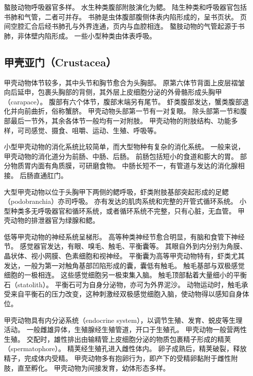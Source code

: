 \documentclass[11pt]{article}
\begin{document}
\newline

螯肢动物呼吸器官多样。
水生种类腹部附肢演化为鳃。
陆生种类和呼吸器官包括书肺和气管，二者可并存。
书肺是虫体腹部腹侧体表内陷形成的，呈书页状。
页间空腔汇合后经书肺孔与外界连通，页内与血腔相连。
螯肢动物的气管起源于书肺，非体壁内陷形成。
一些小型种类由体表呼吸。

\subsection{甲壳亚门（Crustacea）}
甲壳动物体节较多，其中头节和胸节愈合为头胸部。
原第六体节背面上皮层褶皱向后延申，包裹头胸部的背侧，其外层上皮细胞分泌的外骨骼形成头胸甲（carapace）。
腹部有六个体节，腹部末端另有尾节。
虾类腹部发达，蟹类腹部退化并向前曲折，俗称蟹脐。
甲壳动物头部第一节有一对复眼。
除头部第一节和腹部最后一节外，其余各体节一般均有一对附肢。
甲壳动物的附肢结构、功能多样，可司感觉、摄食、咀嚼、运动、生殖、呼吸等。

\newline

小型甲壳动物的消化系统比较简单，而大型物种有复杂的消化系统。
一般来说，甲壳动物的消化道分为前肠、中肠、后肠。
前肠包括短小的食道和膨大的胃。
部分物质胃内面有角质膜，可研磨食物。
中肠长短不一，有管道与发达的消化腺相接。
后肠直通肛门。

\newline

大型甲壳动物以位于头胸甲下两侧的鳃呼吸，虾类附肢基部突起形成的足鳃（podobranchia）亦司呼吸。
亦有发达的肌肉系统和完整的开管式循环系统。
小型种类多无呼吸器官和循环系统，或者循环系统不完整，只有心脏，无血管。
甲壳动物的排泄器官为绿腺和鳃。

\newline

低等甲壳动物的神经系统呈梯形。
高等种类神经节愈合明显，有脑和食管下神经节。
感觉器官发达，有眼、嗅毛、触毛、平衡囊等。
其眼自外到内分别为角膜、晶状体、视小网膜、色素细胞和视神经。
平衡囊为高等甲壳动物特有，虾类尤其发达，一般为第一对触角基部凹陷形成的囊，囊低有触毛。
触毛基部与双极感觉细胞的一极相连。
这些感觉细胞另一极束集入脑。
触毛顶部黏着大量细小的平衡石（statolith）。
平衡石可为自身分泌物，亦可为外界泥沙。
动物运动时，触毛承受来自平衡石的压力改变，这种刺激经双极感觉细胞入脑，使动物得以感知自身体位。

\newline

甲壳动物具有内分泌系统（endocrine system），以调节生殖、发育、蜕皮等生理活动。
一般雌雄异体，生殖腺经生殖管道，开口于生殖孔。
甲壳动物一般营两性生殖。
交配时，雄性排出由输精管上皮细胞分泌的物质包裹精子形成的精荚（spermatophore）。
精荚经生殖孔进入雌性体内。
卵子成熟后，精荚破裂，释放精子，完成体内受精。
甲壳动物多有抱卵行为，即产下的受精卵黏附于雌性附肢，直至孵化。
甲壳动物为间接发育，幼体形态多样。
\end{document}
